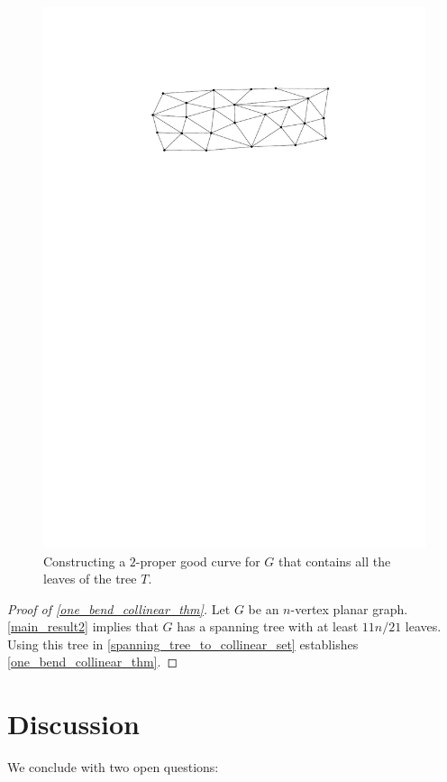 \documentclass[a4paper,UKenglish,cleveref, autoref, thm-restate]{lipics-v2021}
\begin{document}
\begin{figure}
    \includegraphics[page=4]{figs/proper_good}
    \caption{Constructing a $2$-proper good curve for $G$ that contains all the leaves of the tree $T$.}
    \label{tree_walking}
\end{figure}


\begin{proof}[Proof of \cref{one_bend_collinear_thm}]
Let $G$ be an $n$-vertex planar graph. \cref{main_result2} implies that $G$ has a spanning tree with at least $11n/21$ leaves. Using this tree in \cref{spanning_tree_to_collinear_set} establishes \cref{one_bend_collinear_thm}.
\end{proof}

\section{Discussion}


We conclude with two open questions:
\end{document}
